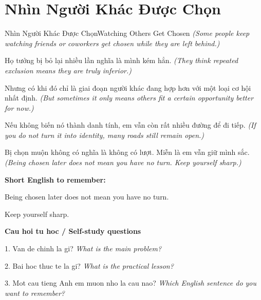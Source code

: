 \section{Nhìn Người Khác Được Chọn}
\begin{truyen}{Nhìn Người Khác Được Chọn}{Watching Others Get Chosen}
\textit{(Some people keep watching friends or coworkers get chosen while they are left behind.)}

Họ tưởng bị bỏ lại nhiều lần nghĩa là mình kém hẳn.
\textit{(They think repeated exclusion means they are truly inferior.)}

Nhưng có khi đó chỉ là giai đoạn người khác đang hợp hơn với một loại cơ hội nhất định.
\textit{(But sometimes it only means others fit a certain opportunity better for now.)}

Nếu không biến nó thành danh tính, em vẫn còn rất nhiều đường để đi tiếp.
\textit{(If you do not turn it into identity, many roads still remain open.)}

\end{truyen}

\begin{baihoc}
Bị chọn muộn không có nghĩa là không có lượt. Miễn là em vẫn giữ mình sắc.
\textit{(Being chosen later does not mean you have no turn. Keep yourself sharp.)}
\end{baihoc}

\begin{ghinhoanh}
\textbf{Short English to remember:}

Being chosen later does not mean you have no turn.

Keep yourself sharp.

\end{ghinhoanh}

\begin{tuhocnhanh}
\textbf{Cau hoi tu hoc / Self-study questions}

1. Van de chinh la gi? \textit{What is the main problem?}

2. Bai hoc thuc te la gi? \textit{What is the practical lesson?}

3. Mot cau tieng Anh em muon nho la cau nao? \textit{Which English sentence do you want to remember?}
\end{tuhocnhanh}
\ngancach


